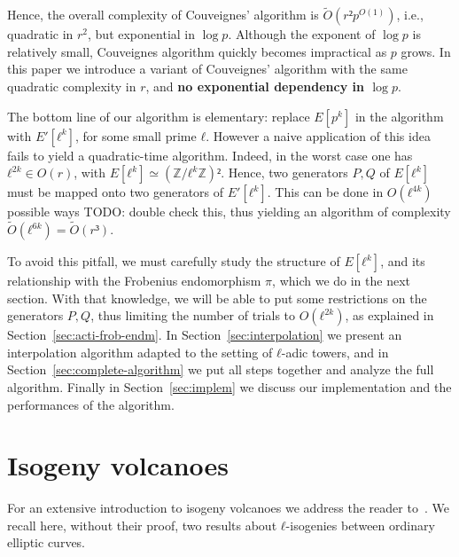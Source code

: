 \documentclass{lms}
\newcommand{\todo}[1]{{\color{red}TODO: #1}}
\newcommand{\tildO}{\tilde{O}}
\begin{document}
Hence, the overall complexity of Couveignes' algorithm is
$\tildO(r²p^{O(1)})$, i.e., quadratic in $r^2$, but exponential in
$\log p$. Although the exponent of $\log p$ is relatively small, Couveignes
algorithm quickly becomes impractical as $p$ grows. In this paper we
introduce a variant of Couveignes' algorithm with the same quadratic
complexity in $r$, and \textbf{no exponential dependency in $\log p$}.

The bottom line of our algorithm is elementary: replace $E[p^k]$ in
the algorithm with $E'[ℓ^k]$, for some small prime $ℓ$. However a
naive application of this idea fails to yield a quadratic-time
algorithm. Indeed, in the worst case one has $ℓ^{2k}∈O(r)$, with
$E[ℓ^k]≃(ℤ/ℓ^kℤ)²$. Hence, two generators $P,Q$ of $E[ℓ^k]$ must
be mapped onto two generators of $E'[ℓ^k]$. This can be done in
$O(ℓ^{4k})$ possible ways \todo{double check this}, thus yielding an
algorithm of complexity $\tildO(ℓ^{6k})=\tildO(r³)$.

To avoid this pitfall, we must carefully study the structure of
$E[ℓ^k]$, and its relationship with the Frobenius endomorphism $π$,
which we do in the next section. With that knowledge, we will be able
to put some restrictions on the generators $P,Q$, thus limiting the
number of trials to $O(ℓ^{2k})$, as explained in
Section~\ref{sec:acti-frob-endm}.  In Section~\ref{sec:interpolation}
we present an interpolation algorithm adapted to the setting of
$ℓ$-adic towers, and in Section~\ref{sec:complete-algorithm} we put
all steps together and analyze the full algorithm. Finally in
Section~\ref{sec:implem} we discuss our implementation and the
performances of the algorithm.



\section{Isogeny volcanoes}
\label{sec:isogeny-volcanoes}

For an extensive introduction to isogeny volcanoes we address the
reader to~\cite{sutherland2013isogeny}.  We recall here, without their
proof, two results about $ℓ$-isogenies between ordinary elliptic
curves.
\end{document}
